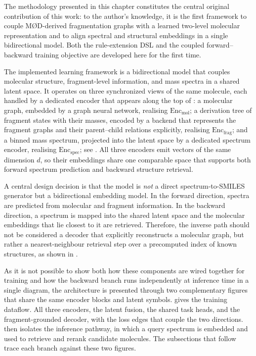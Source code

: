 The methodology presented in this chapter constitutes the central original contribution of this work: to the author's knowledge, it is the first framework to couple M\O D-derived fragmentation graphs with a learned two-level molecular representation and to align spectral and structural embeddings in a single bidirectional model.
Both the rule-extension DSL and the coupled forward--backward training objective are developed here for the first time.

The implemented learning framework is a bidirectional model that couples molecular structure, fragment-level information, and mass spectra in a shared latent space.
It operates on three synchronized views of the same molecule, each handled by a dedicated encoder that appears along the top of : a molecular graph, embedded by a graph neural network, realising $\mathrm{Enc}_{\mathrm{mol}}$; a derivation tree of fragment states with their masses, encoded by a backend that represents the fragment graphs and their parent--child relations explicitly, realising $\mathrm{Enc}_{\mathrm{frag}}$; and a binned mass spectrum, projected into the latent space by a dedicated spectrum encoder, realising $\mathrm{Enc}_{\mathrm{spec}}$; see .
All three encoders emit vectors of the same dimension $d$, so their embeddings share one comparable space that supports both forward spectrum prediction and backward structure retrieval.

A central design decision is that the model is \emph{not} a direct spectrum-to-SMILES generator but a bidirectional embedding model.
In the forward direction, spectra are predicted from molecular and fragment information. In the backward direction, a spectrum is mapped into the shared latent space and the molecular embeddings that lie closest to it are retrieved.
Therefore, the inverse path should not be considered a decoder that explicitly reconstructs a molecular graph, but rather a nearest-neighbour retrieval step over a precomputed index of known structures, as shown in .

As it is not possible to show both how these components are wired together for training and how the backward branch runs independently at inference time in a single diagram, the architecture is presented through two complementary figures that share the same encoder blocks and latent symbols.
 gives the training dataflow. All three encoders, the latent fusion, the shared task heads, and the fragment-grounded decoder, with the loss edges that couple the two directions.
 then isolates the inference pathway, in which a query spectrum is embedded and used to retrieve and rerank candidate molecules.
The subsections that follow trace each branch against these two figures.

